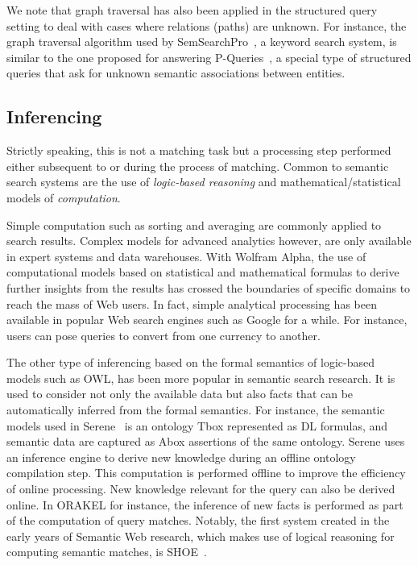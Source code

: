 We note that graph traversal has also been applied in the structured query setting to deal with cases where relations (paths) are unknown. For instance, the graph traversal algorithm used by SemSearchPro~\cite{DBLP:journals/ws/TranHL11,DBLP:conf/icde/TranWRC09}, a keyword search system, is similar to the one proposed for answering P-Queries~\cite{DBLP:conf/www/AnyanwuS03}, a special type of structured queries that ask for unknown semantic associations between entities. 


	\subsection{Inferencing} Strictly speaking, this is not a matching task but a processing step performed either subsequent to or during the process of matching. Common to semantic search systems are the use of \emph{logic-based reasoning} and mathematical/statistical models of \emph{computation}. 
	
	Simple computation such as sorting and averaging are commonly applied to search results. Complex models for advanced analytics however, are only available in expert systems and data warehouses. With Wolfram Alpha, the use of computational models based on statistical and mathematical formulas to derive further insights from the results has crossed the boundaries of specific domains to reach the mass of Web users. In fact, simple analytical processing has been available in popular Web search engines such as Google for a while. For instance, users can pose queries to convert from one currency to another. 
	
	The other type of inferencing based on the formal semantics of logic-based models such as OWL, has been more popular in semantic search research. 
It is used 
to consider not only the available data but also facts that can be automatically inferred from the formal semantics. For instance, the semantic models used in Serene~\cite{DBLP:journals/ws/FazzingaGGL11} is an ontology Tbox represented as DL formulas, and semantic data are captured as Abox assertions of the same ontology. Serene uses an inference engine to derive new knowledge during an offline ontology compilation step. This computation is performed offline to improve the efficiency of online processing. 
New knowledge relevant for the query can also be derived online. 
In ORAKEL for instance, the inference of new facts is performed as part of the computation of query matches. Notably, the first system created in the early years of Semantic Web research, which makes use of logical reasoning for computing semantic matches, is SHOE~\cite{DBLP:conf/dagstuhl/HeflinHL03}. 
	
